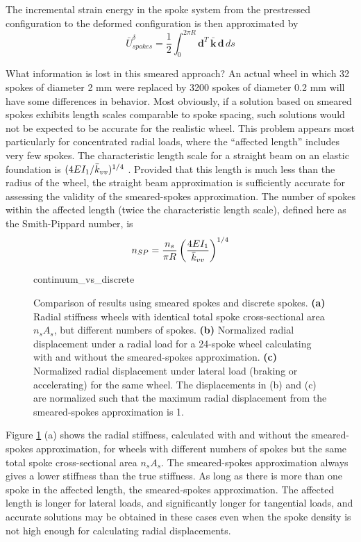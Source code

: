\documentclass[\rootdir/thesis.tex]{subfiles}
\begin{document}
The incremental strain energy in the spoke system from the prestressed configuration to the deformed configuration is then approximated by
\begin{equation}
\label{eq:dU_spokes_cont}
\bar{U}_{spokes}^{\delta} = \frac{1}{2}\int_0^{2\pi R} \mathbf{d}^T\, \mathbf{\bar{k}}\, \mathbf{d} \, ds
\end{equation}

What information is lost in this smeared approach? An actual wheel in which 32 spokes of diameter 2 mm were replaced by 3200 spokes of diameter 0.2 mm will have some differences in behavior. Most obviously, if a solution based on smeared spokes exhibits length scales comparable to spoke spacing, such solutions would not be expected to be accurate for the realistic wheel. This problem appears most particularly for concentrated radial loads, where the ``affected length'' includes very few spokes. The characteristic length scale for a straight beam on an elastic foundation is $(4EI_1/\bar{k}_{vv})^{1/4}$ \cite{Hetenyi1946}. Provided that this length is much less than the radius of the wheel, the straight beam approximation is sufficiently accurate for assessing the validity of the smeared-spokes approximation. The number of spokes within the affected length (twice the characteristic length scale), defined here as the Smith-Pippard number, is
\begin{equation}
n_{SP} = \frac{n_s}{\pi R} \left(\frac{4EI_1}{\bar{k}_{vv}}\right)^{1/4}
\end{equation}

\begin{figure}[t]
\centering
{continuum_vs_discrete}
\caption{Comparison of results using smeared spokes and discrete spokes. \textbf{(a)} Radial stiffness wheels with identical total spoke cross-sectional area $n_sA_s$, but different numbers of spokes. \textbf{(b)} Normalized radial displacement under a radial load for a 24-spoke wheel calculating with and without the smeared-spokes approximation. \textbf{(c)} Normalized radial displacement under lateral load (braking or accelerating) for the same wheel. The displacements in (b) and (c) are normalized such that the maximum radial displacement from the smeared-spokes approximation is 1.}
\label{fig:continuum_vs_discrete}
\end{figure}

Figure \ref{fig:continuum_vs_discrete} (a) shows the radial stiffness, calculated with and without the smeared-spokes approximation, for wheels with different numbers of spokes but the same total spoke cross-sectional area $n_sA_s$. The smeared-spokes approximation always gives a lower stiffness than the true stiffness. As long as there is more than one spoke in the affected length, the smeared-spokes approximation. The affected length is longer for lateral loads, and significantly longer for tangential loads, and accurate solutions may be obtained in these cases even when the spoke density is not high enough for calculating radial displacements.
\end{document}
